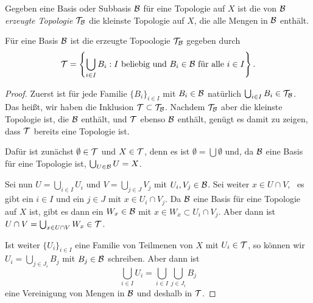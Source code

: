 \begin{definition}
Gegeben eine Basis oder Subbasis $\cal B$ für eine Topologie auf $X$ ist die von $\cal B$
\emph{erzeugte Topologie} $\cal T_{\cal B}$ die kleinste Topologie auf $X$, die alle Mengen in
$\cal B$ enthält.
\end{definition}
\begin{theorem}
Für eine Basis $\cal B$ ist die erzeugte Topoologie $\cal T_{\cal B}$ gegeben
durch
\[
\cal T = \left\{\bigcup_{i\in I} B_i : \text{$I$ beliebig und $B_i\in\cal B$
für alle $i\in I$}\right\}.
\]
\end{theorem}
\begin{proof}
Zuerst ist für jede Familie $\{B_i\}_{i\in I}$ mit $B_i\in\cal B$ natürlich
$\bigcup_{i\in I} B_i\in\cal T_{\cal B}$. Das heißt, wir haben die Inklusion
$\cal T\subset\cal T_{\cal B}$. Nachdem $\cal T_{\cal B}$ aber die kleinste
Topologie ist, die $\cal B$ enthält, und $\cal T$ ebenso $\cal B$ enthält,
genügt es damit zu zeigen, dass $\cal T$ bereits eine Topologie ist.

Dafür ist zunächst $\emptyset\in\cal T$ und $X\in\cal T$, denn es ist $\emptyset
= \bigcup\emptyset$ und, da $\cal B$ eine Basis für eine Topologie ist,
$\bigcup_{U\in \cal B} U = X$.

Sei nun $U = \bigcup_{i\in I} U_i$ und $V = \bigcup_{j\in J} V_j$ mit
$U_i,V_j\in\cal B$. Sei weiter $x\in U\cap V$, \ddh~es gibt ein $i\in I$ und ein
$j\in J$ mit $x\in U_i\cap V_j$. Da $\cal B$ eine Basis für eine Topologie auf
$X$ ist, gibt es dann ein $W_x\in\cal B$ mit $x\in W_x\subset U_i\cap V_j$. Aber
dann ist $U\cap V = \bigcup_{x\in U\cap V} W_x\in\cal T$.

Ist weiter $\{U_i\}_{i\in I}$ eine Familie von Teilmenen von $X$ mit
$U_i\in\cal T$, so können wir $U_i = \bigcup_{j\in J_i} B_j$ mit $B_j\in\cal B$
schreiben. Aber dann ist
\[
\bigcup_{i\in I} U_i = \bigcup_{i\in I}\bigcup_{j\in J_i} B_j
\]
eine Vereinigung von Mengen in $\cal B$ und deshalb in $\cal T$.
\end{proof}

